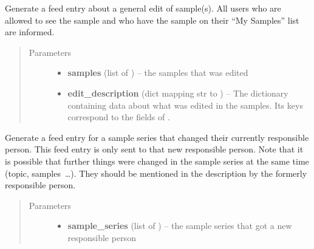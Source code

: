 \documentclass[a4paper,11pt,english]{sphinxmanual}
\begin{document}
\begin{fulllineitems}
\begin{fulllineitems}
\label{programming/utilities:samples.utils.views.Reporter.report_edited_samples}
Generate a feed entry about a general edit of sample(s).  All users
who are allowed to see the sample and who have the sample on their “My
Samples” list are informed.
\begin{quote}\begin{description}
\item[{Parameters}] \leavevmode\begin{itemize}
\item {} 
\textbf{samples} (list of ) -- the samples that was edited

\item {} 
\textbf{edit\_description} (dict mapping str to ) -- The dictionary containing data about what was
edited in the samples.  Its keys correspond to the fields of
{\hyperref[programming/utilities:samples.utils.views.EditDescriptionForm]{}}.

\end{itemize}

\end{description}\end{quote}

\end{fulllineitems}


\begin{fulllineitems}
\label{programming/utilities:samples.utils.views.Reporter.report_new_responsible_person_sample_series}
Generate a feed entry for a sample series that changed their
currently responsible person.  This feed entry is only sent to that new
responsible person.  Note that it is possible that further things were
changed in the sample series at the same time (topic, samples …).
They should be mentioned in the description by the formerly responsible
person.
\begin{quote}\begin{description}
\item[{Parameters}] \leavevmode\begin{itemize}
\item {} 
\textbf{sample\_series} (list of ) -- the sample series that got a new responsible
person


\end{itemize}
\end{description}
\end{quote}
\end{fulllineitems}
\end{fulllineitems}
\end{document}
